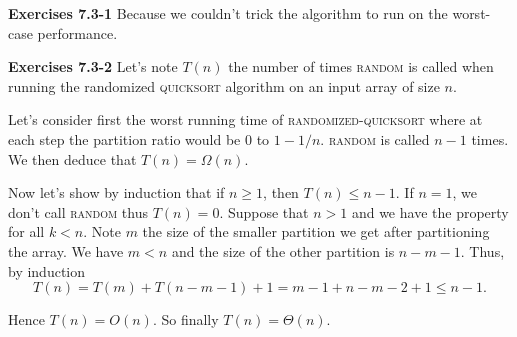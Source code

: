 \documentclass[a4paper,12pt]{article}
\newcommand{\newpar}[1]
{\bigskip \noindent \textbf{Exercises #1} \newline}
\begin{document}
\newpar{7.3-1}
Because we couldn't trick the algorithm to run on the worst-case
performance.

\newpar{7.3-2} Let's note $T(n)$ the number of times \textsc{random}
is called when running the randomized \textsc{quicksort} algorithm on
an input array of size $n$.

Let's consider first the worst running time of
\textsc{randomized-quicksort} where at each step the partition ratio
would be $0$ to $1-1/n$. \textsc{random} is called $n-1$ times.  We
then deduce that $T(n) = \Omega(n)$.

Now let's show by induction that if $n \ge 1$, then $T(n) \le n-1$.
If $n = 1$, we don't call \textsc{random} thus $T(n) = 0$.  Suppose
that $n > 1$ and we have the property for all $k < n$.  Note $m$ the size
of the smaller partition we get after partitioning the array.  We have
$m < n$ and the size of the other partition is $n-m-1$.  Thus, by
induction
\[ T(n) = T(m) + T(n-m-1) + 1 = m-1 + n-m-2 + 1 \le n-1.\]

Hence $T(n) = O(n)$.  So finally $T(n) = \Theta(n)$.
\end{document}
